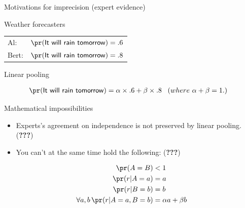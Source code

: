 \documentclass[10pt,ignorenonframetext,x11names, dvipsnames, bibspacing,natbib]{beamer}
\begin{document}
\begin{frame}{Motivations for imprecision \large (expert evidence)}

\begin{block}{Weather forecasters}

\vspace{-1mm}

\begin{tabular}{ll}
Al: & $\pr(\mathsf{It \,\,  will\,\,  rain\,\,  tomorrow})=.6$\\
Bert: & $\pr(\mathsf{It \,\,  will\,\,  rain\,\,  tomorrow})=.8$
\end{tabular}

\pause

\end{block}

\begin{block}{Linear pooling}

\vspace{-4mm}

\begin{align*}
\pr(\mathsf{It \,\,  will\,\,  rain\,\,  tomorrow}) & = 
\alpha \times .6 + \beta \times .8 \,\,\,\,\,  (where \,\, \alpha + \beta = 1.)
\end{align*}

\pause

\end{block}

\begin{block}{Mathematical impossibilities}

\begin{itemize}
\item
  Experts's agreement on independence is not preserved by linear
  pooling. ({\textbf{???}})
\item
  You can't at the same time hold the following: ({\textbf{???}})
\end{itemize}

\vspace{-7mm}

\begin{align}
\pr(A=B) & <1\\
\pr(r\vert A=a) & = a \\
\pr(r\vert B=b) & = b \\
\forall a,b \, \pr(r \vert A =a, B = b) & =  \alpha a + \beta b
\end{align}

\end{block}

\end{frame}
\end{document}

